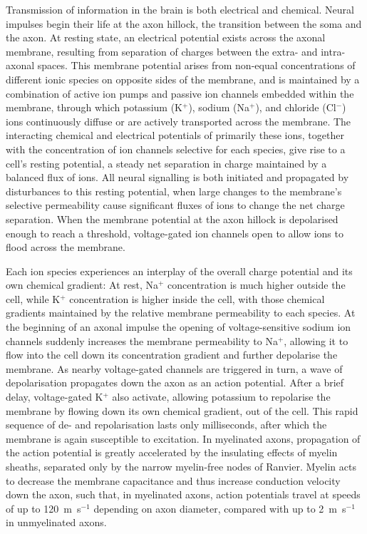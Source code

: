 \documentclass[12pt,phd,a4paper,twoside]{ucl_thesis}
\begin{document}
Transmission of information in the brain is both electrical and chemical.
Neural impulses begin their life at the axon hillock, the transition between the soma and the axon.
At resting state, an electrical potential exists across the axonal membrane, resulting from separation of charges between the extra- and intra-axonal spaces.
This membrane potential arises from non-equal concentrations of different ionic species on opposite sides of the membrane, and is maintained by a combination of active ion pumps and passive ion channels embedded within the membrane, through which potassium (K$^+$), sodium (Na$^+$), and chloride (Cl$^-$) ions continuously diffuse or are actively transported across the membrane.
The interacting chemical and electrical potentials of primarily these ions, together with the concentration of ion channels selective for each species, give rise to a cell's resting potential, a steady net separation in charge maintained by a balanced flux of ions.
All neural signalling is both initiated and propagated by disturbances to this resting potential, when large changes to the membrane's selective permeability cause significant fluxes of ions to change the net charge separation.
When the membrane potential at the axon hillock is depolarised enough to reach a threshold, voltage-gated ion channels open to allow ions to flood across the membrane.

Each ion species experiences an interplay of the overall charge potential and its own chemical gradient:
At rest, Na$^+$ concentration is much higher outside the cell, while K$^+$ concentration is higher inside the cell, with those chemical gradients maintained by the relative membrane permeability to each species.
At the beginning of an axonal impulse the opening of voltage-sensitive sodium ion channels suddenly increases the membrane permeability to Na$^+$, allowing it to flow into the cell down its concentration gradient and further depolarise the membrane.
As nearby voltage-gated channels are triggered in turn, a wave of depolarisation propagates down the axon as an action potential.
After a brief delay, voltage-gated K$^+$ also activate, allowing potassium to repolarise the membrane by flowing down its own chemical gradient, out of the cell.
This rapid sequence of de- and repolarisation lasts only milliseconds, after which the membrane is again susceptible to excitation.
In myelinated axons, propagation of the action potential is greatly accelerated by the insulating effects of myelin sheaths, separated only by the narrow myelin-free nodes of Ranvier.
Myelin acts to decrease the membrane capacitance and thus increase conduction velocity down the axon, such that, in myelinated axons, action potentials travel at speeds of up to 120~m~s$^{-1}$ depending on axon diameter, compared with up to 2~m~s$^{-1}$ in unmyelinated axons.
\end{document}
